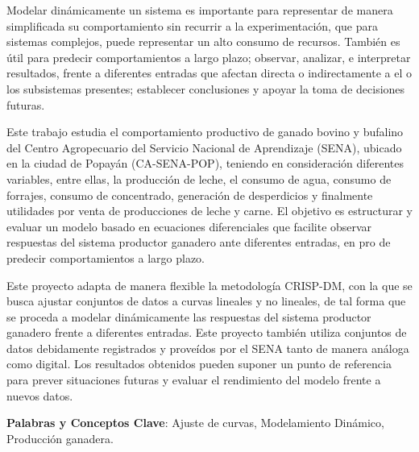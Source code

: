 
Modelar dinámicamente un sistema es importante para representar de manera simplificada su comportamiento sin recurrir a la experimentación, que para sistemas complejos, puede representar un alto consumo de recursos. También es útil para predecir comportamientos a largo plazo; observar, analizar, e interpretar resultados, frente a diferentes entradas que afectan directa o indirectamente a el o los subsistemas presentes; establecer conclusiones y apoyar la toma de decisiones futuras.

Este trabajo estudia el comportamiento productivo de ganado bovino y bufalino del Centro Agropecuario del Servicio Nacional de Aprendizaje (SENA), ubicado en la ciudad de Popayán (CA-SENA-POP), teniendo en consideración diferentes variables, entre ellas, la producción de leche, el consumo de agua, consumo de forrajes, consumo de concentrado, generación de desperdicios y finalmente utilidades por venta de producciones de leche y carne. El objetivo es estructurar y evaluar un modelo basado en ecuaciones diferenciales que facilite observar respuestas del sistema productor ganadero ante diferentes entradas, en pro de predecir comportamientos a largo plazo.

Este proyecto adapta de manera flexible la metodología CRISP-DM, con la que se busca ajustar conjuntos de datos a curvas lineales y no lineales, de tal forma que se proceda a modelar dinámicamente las respuestas del sistema productor ganadero frente a diferentes entradas. Este proyecto también utiliza conjuntos de datos debidamente registrados y proveídos por el SENA tanto de manera análoga como digital. Los resultados obtenidos pueden suponer un punto de referencia para prever situaciones futuras y evaluar el rendimiento del modelo frente a nuevos datos.

{\bf Palabras y Conceptos Clave}: Ajuste de curvas, Modelamiento Dinámico, Producción ganadera.

\cleardoublepage
